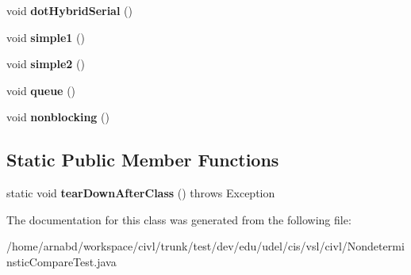 \begin{DoxyCompactItemize}
\item 
\hypertarget{classedu_1_1udel_1_1cis_1_1vsl_1_1civl_1_1NondeterminsticCompareTest_a8898293fd87ae22087fc9be4f282b010}{}void {\bfseries dot\+Hybrid\+Serial} ()\label{classedu_1_1udel_1_1cis_1_1vsl_1_1civl_1_1NondeterminsticCompareTest_a8898293fd87ae22087fc9be4f282b010}

\item 
\hypertarget{classedu_1_1udel_1_1cis_1_1vsl_1_1civl_1_1NondeterminsticCompareTest_a28a844fc622c195053bd6d38ae059a69}{}void {\bfseries simple1} ()\label{classedu_1_1udel_1_1cis_1_1vsl_1_1civl_1_1NondeterminsticCompareTest_a28a844fc622c195053bd6d38ae059a69}

\item 
\hypertarget{classedu_1_1udel_1_1cis_1_1vsl_1_1civl_1_1NondeterminsticCompareTest_a6a3072123781898e1c3725e352f27d6a}{}void {\bfseries simple2} ()\label{classedu_1_1udel_1_1cis_1_1vsl_1_1civl_1_1NondeterminsticCompareTest_a6a3072123781898e1c3725e352f27d6a}

\item 
\hypertarget{classedu_1_1udel_1_1cis_1_1vsl_1_1civl_1_1NondeterminsticCompareTest_ac299d2a1a96c2802dcd54769fe1a8783}{}void {\bfseries queue} ()\label{classedu_1_1udel_1_1cis_1_1vsl_1_1civl_1_1NondeterminsticCompareTest_ac299d2a1a96c2802dcd54769fe1a8783}

\item 
\hypertarget{classedu_1_1udel_1_1cis_1_1vsl_1_1civl_1_1NondeterminsticCompareTest_af672ef10c85a1b95b6ee0fb560c89fb7}{}void {\bfseries nonblocking} ()\label{classedu_1_1udel_1_1cis_1_1vsl_1_1civl_1_1NondeterminsticCompareTest_af672ef10c85a1b95b6ee0fb560c89fb7}

\end{DoxyCompactItemize}
\subsection*{Static Public Member Functions}
\begin{DoxyCompactItemize}
\item 
\hypertarget{classedu_1_1udel_1_1cis_1_1vsl_1_1civl_1_1NondeterminsticCompareTest_ab47b3edf58b8566e1519a4e0964e2cd2}{}static void {\bfseries tear\+Down\+After\+Class} ()  throws Exception \label{classedu_1_1udel_1_1cis_1_1vsl_1_1civl_1_1NondeterminsticCompareTest_ab47b3edf58b8566e1519a4e0964e2cd2}

\end{DoxyCompactItemize}


The documentation for this class was generated from the following file\+:\begin{DoxyCompactItemize}
\item 
/home/arnabd/workspace/civl/trunk/test/dev/edu/udel/cis/vsl/civl/Nondeterminstic\+Compare\+Test.\+java\end{DoxyCompactItemize}
